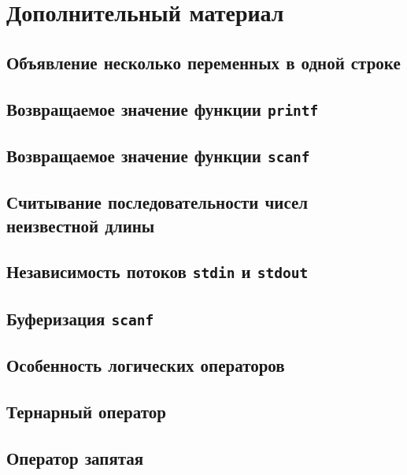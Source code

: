 \documentclass[10pt]{article}
\begin{document}
\section*{Дополнительный материал}
\subsection*{Объявление несколько переменных в одной строке}
\subsection*{Возвращаемое значение функции \texttt{printf}}
\subsection*{Возвращаемое значение функции \texttt{scanf}}
\subsection*{Считывание последовательности чисел неизвестной длины}

\subsection*{Независимость потоков \texttt{stdin} и \texttt{stdout}}

\subsection*{Буферизация \texttt{scanf}}

\subsection*{Особенность логических операторов}
\subsection*{Тернарный оператор}
\subsection*{Оператор запятая}
\end{document}
